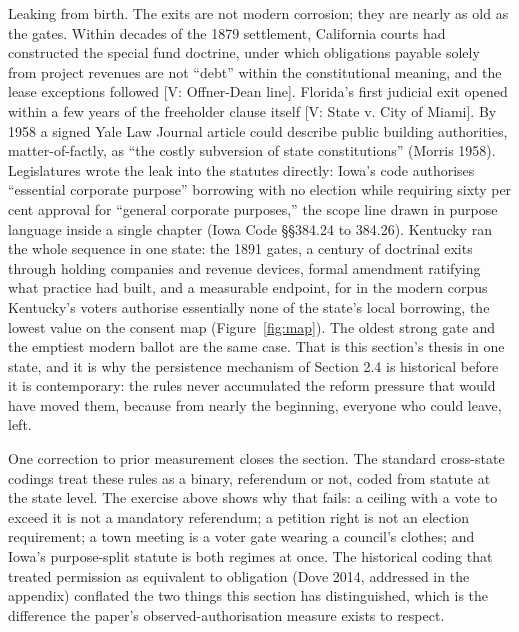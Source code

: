 Leaking from birth. The exits are not modern corrosion; they are nearly as old as the gates. Within decades of the 1879 settlement, California courts had constructed the special fund doctrine, under which obligations payable solely from project revenues are not ``debt'' within the constitutional meaning, and the lease exceptions followed [V: Offner-Dean line]. Florida's first judicial exit opened within a few years of the freeholder clause itself [V: State v. City of Miami]. By 1958 a signed Yale Law Journal article could describe public building authorities, matter-of-factly, as ``the costly subversion of state constitutions'' (Morris 1958). Legislatures wrote the leak into the statutes directly: Iowa's code authorises ``essential corporate purpose'' borrowing with no election while requiring sixty per cent approval for ``general corporate purposes,'' the scope line drawn in purpose language inside a single chapter (Iowa Code \S\S384.24 to 384.26). Kentucky ran the whole sequence in one state: the 1891 gates, a century of doctrinal exits through holding companies and revenue devices, formal amendment ratifying what practice had built, and a measurable endpoint, for in the modern corpus Kentucky's voters authorise essentially none of the state's local borrowing, the lowest value on the consent map (Figure~\ref{fig:map}). The oldest strong gate and the emptiest modern ballot are the same case. That is this section's thesis in one state, and it is why the persistence mechanism of Section 2.4 is historical before it is contemporary: the rules never accumulated the reform pressure that would have moved them, because from nearly the beginning, everyone who could leave, left.


One correction to prior measurement closes the section. The standard cross-state codings treat these rules as a binary, referendum or not, coded from statute at the state level. The exercise above shows why that fails: a ceiling with a vote to exceed it is not a mandatory referendum; a petition right is not an election requirement; a town meeting is a voter gate wearing a council's clothes; and Iowa's purpose-split statute is both regimes at once. The historical coding that treated permission as equivalent to obligation (Dove 2014, addressed in the appendix) conflated the two things this section has distinguished, which is the difference the paper's observed-authorisation measure exists to respect.

